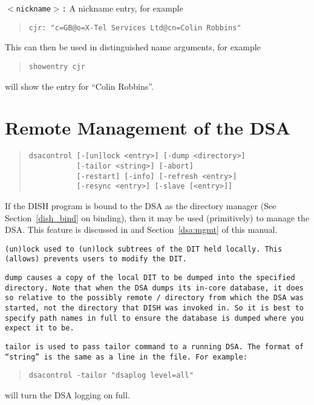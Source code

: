 \begin{describe}
\item [\tt $<$nickname$>$:] A nickname entry, for example
\begin{quote}\small\begin{verbatim}
cjr: "c=GB@o=X-Tel Services Ltd@cn=Colin Robbins"
\end{verbatim}\end{quote}
This can then be used in distinguished name arguments, for example
\begin{quote}\begin{verbatim}
showentry cjr
\end{verbatim} \end{quote}
will show the entry for ``Colin Robbins''.

\end{describe}


\section {Remote Management of the DSA}\label{dua:mgmt}
\begin{quote}\begin{verbatim}
dsacontrol [-[un]lock <entry>] [-dump <directory>] 
           [-tailor <string>] [-abort] 
           [-restart] [-info] [-refresh <entry>]
           [-resync <entry>] [-slave [<entry>]]
\end{verbatim}\end{quote}

If the DISH program is bound to the DSA as the directory manager
(See Section~\ref{dish_bind} on binding),
then it may be used (primitively) to manage the DSA.
This feature is discussed in \cite{QUIPU.Design} and Section~\ref{dsa:mgmt}
of this manual.

\tt (un)lock\rm \ used to (un)lock subtrees of the DIT held locally. This
(allows) prevents users to modify the DIT.

\tt dump\rm \ causes a copy of the local DIT to be dumped into the specified 
directory.
Note that when the DSA dumps its in-core database,
it does so relative to the possibly remote \unix/ directory from which the
DSA was started,
not the directory that DISH was invoked in.
So it is best to specify path names in full to ensure the database is dumped
where you expect it to be.

\tt tailor\rm \ is used to pass tailor command to a running DSA.  The format of
``string'' is the same as a line in the  file.
For example:
\begin{quote}\begin{verbatim}
dsacontrol -tailor "dsaplog level=all"
\end{verbatim}\end{quote}
will turn the DSA logging on full.

